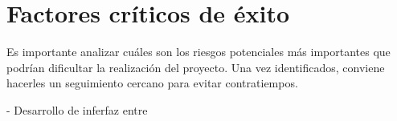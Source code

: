 \section{Factores críticos de éxito}
\label{sec:fact_exito}

Es importante analizar cuáles son los riesgos potenciales más importantes que podrían dificultar la realización del proyecto. Una vez identificados, conviene hacerles un seguimiento cercano para evitar contratiempos.

- Desarrollo de inferfaz entre

